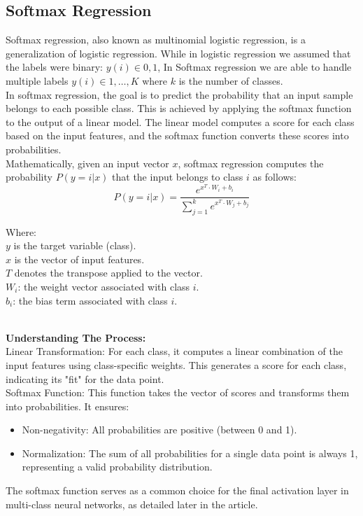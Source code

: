 \documentclass{article}
\begin{document}
\subsection{Softmax Regression}
Softmax regression, also known as multinomial logistic regression, is a generalization of logistic regression.
While in logistic regression we assumed that the labels were binary: ${y(i)\in{0,1}}$, In Softmax regression we are able to handle multiple labels ${y(i)\in{1,…,K}}$ where ${k}$ is the number of classes.\\
In softmax regression, the goal is to predict the probability that an input sample belongs to each possible class. This is achieved by applying the softmax function to the output of a linear model. The linear model computes a score for each class based on the input features, and the softmax function converts these scores into probabilities.\\
Mathematically, given an input vector ${x}$, softmax regression computes the probability ${P(y=i | x)}$ that the input belongs to class ${i}$ as follows:
$${P(y=i | x) = \frac{e^{x^{T} \cdot W_i + b_i}}{\sum_{j=1}^{k} e^{x^{T} \cdot W_j + b_j}}
        }$$

\noindent\hspace*{10mm}
\begin{minipage}{\dimexpr\linewidth-20mm}
    Where:\\
    ${y}$ is the target variable (class).\\
    ${x}$ is the vector of input features.\\
    ${T}$ denotes the transpose applied to the vector.\\
    ${W_i}$: the weight vector associated with class ${i}$.\\
    ${b_i}$: the bias term associated with class ${i}$.\\
\end{minipage}\\
\textbf{Understanding The Process:}\hfill\newline\\
Linear Transformation: For each class, it computes a linear combination of the input features using class-specific weights. This generates a score for each class, indicating its "fit" for the data point.\hfill\newline\\
Softmax Function: This function takes the vector of scores and transforms them into probabilities. It ensures:
\begin{itemize}
    \item Non-negativity: All probabilities are positive (between 0 and 1).
\end{itemize}
\begin{itemize}
    \item Normalization: The sum of all probabilities for a single data point is always 1, representing a valid probability distribution.
\end{itemize}
The softmax function serves as a common choice for the final activation layer in multi-class neural networks, as detailed later in the article.
\end{document}
